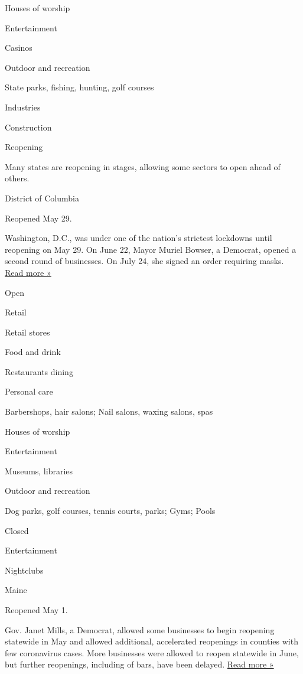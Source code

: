 Houses of worship

Entertainment

Casinos

Outdoor and recreation

State parks, fishing, hunting, golf courses

Industries

Construction

Reopening

Many states are reopening in stages, allowing some sectors to open ahead
of others.

District of Columbia

Reopened May 29.

Washington, D.C., was under one of the nation's strictest lockdowns
until reopening on May 29. On June 22, Mayor Muriel Bowser, a Democrat,
opened a second round of businesses. On July 24, she signed an order
requiring masks.
\href{https://dcist.com/story/20/07/29/d-c-just-made-it-harder-to-move-to-phase-three-of-reopening/}{Read
more »}

Open

Retail

Retail stores

Food and drink

Restaurants dining

Personal care

Barbershops, hair salons; Nail salons, waxing salons, spas

Houses of worship

Entertainment

Museums, libraries

Outdoor and recreation

Dog parks, golf courses, tennis courts, parks; Gyms; Pools

Closed

Entertainment

Nightclubs

Maine

Reopened May 1.

Gov. Janet Mills, a Democrat, allowed some businesses to begin reopening
statewide in May and allowed additional, accelerated reopenings in
counties with few coronavirus cases. More businesses were allowed to
reopen statewide in June, but further reopenings, including of bars,
have been delayed.
\href{https://bangordailynews.com/2020/06/22/business/janet-mills-postpones-reopening-indoor-bar-service-citing-infections-in-other-states/}{Read
more »}


